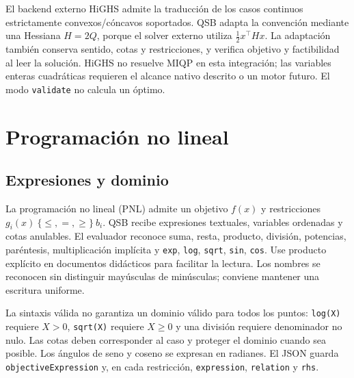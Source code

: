 El backend externo HiGHS admite la traducción de los casos continuos
estrictamente convexos/cóncavos soportados. QSB adapta la convención mediante
una Hessiana \(H=2Q\), porque el solver externo utiliza
\(\tfrac12 x^\top Hx\). La adaptación también conserva sentido, cotas y
restricciones, y verifica objetivo y factibilidad al leer la solución.
HiGHS no resuelve MIQP en esta integración; las variables enteras cuadráticas
requieren el alcance nativo descrito o un motor futuro. El modo
\texttt{validate} no calcula un óptimo.

\section{Programación no lineal}
\subsection{Expresiones y dominio}
La programación no lineal (PNL) admite un objetivo \(f(x)\) y restricciones
\(g_i(x)\ \{\leq,=,\geq\}\ b_i\). QSB recibe expresiones textuales,
variables ordenadas y cotas anulables. El evaluador reconoce suma, resta,
producto, división, potencias, paréntesis, multiplicación implícita y
\texttt{exp}, \texttt{log}, \texttt{sqrt}, \texttt{sin}, \texttt{cos}.
Use producto explícito en documentos didácticos para facilitar la lectura.
Los nombres se reconocen sin distinguir mayúsculas de minúsculas; conviene
mantener una escritura uniforme.

La sintaxis válida no garantiza un dominio válido para todos los puntos:
\texttt{log(X)} requiere \(X>0\), \texttt{sqrt(X)} requiere \(X\geq0\) y una
división requiere denominador no nulo. Las cotas deben corresponder al caso
y proteger el dominio cuando sea posible. Los ángulos de seno y coseno se
expresan en radianes. El JSON guarda \texttt{objectiveExpression} y, en cada
restricción, \texttt{expression}, \texttt{relation} y \texttt{rhs}.

